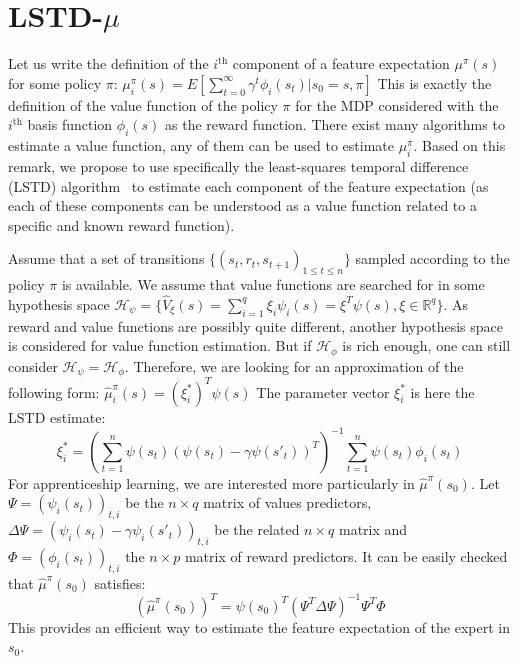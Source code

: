 \documentclass{llncs}
\begin{document}
\section{LSTD-$\mu$}
\label{sec:lstdmu}
Let us write the definition of the $i^\text{th}$ component of a
feature expectation $\mu^\pi(s)$ for some policy $\pi$:
$  \mu_i^\pi(s) = E[\sum\limits_{t=0}^\infty \gamma^t \phi_i(s_t)|s_0=s,\pi]$
This is exactly the definition of the value function of the policy
$\pi$ for the MDP considered with the $i^\text{th}$ basis function
$\phi_i(s)$ as the reward function. There exist many algorithms to
estimate a value function, any of them can be used to estimate
$\mu_i^\pi$. Based on this remark, we propose to use specifically
the least-squares temporal difference (LSTD)
algorithm~\citep{bradtke1996linear} to estimate each component of the
feature expectation (as each of these components can be understood
as a value function related to a specific and known reward
function).

Assume that a set of transitions $\{(s_t,r_t,s_{t+1})_{1\leq t \leq
n}\}$ sampled according to the policy $\pi$ is available. We assume
that value functions are searched for in some  hypothesis space
$\mathcal{H}_\psi = \{ \hat{V}_\xi(s) = \sum\limits_{i=1}^q \xi_i \psi_i(s)
= \xi^T \psi(s), \xi\in\mathbb{R}^q\}$. As reward and value
functions are possibly quite different, another hypothesis space is
considered for value function estimation. But if $\mathcal{H}_\phi$
is rich enough, one can still consider
$\mathcal{H}_\psi=\mathcal{H}_\phi$. Therefore, we are looking for
an approximation of the following form:
$  \hat{\mu}_i^\pi(s) = (\xi_i^*)^T \psi(s)$
The parameter vector $\xi_i^*$ is here the LSTD estimate:
\begin{equation}
  \xi_i^* = \left(\sum_{t=1}^n
  \psi(s_t)(\psi(s_t)-\gamma\psi(s'_{t}))^T\right)^{-1}
  \sum_{t=1}^n \psi(s_t) \phi_i(s_t)
\end{equation}
For apprenticeship learning, we are interested more particularly in
$\hat{\mu}^\pi(s_0)$. Let $\Psi = (\psi_i(s_t))_{t,i}$ be the
$n\times q$ matrix of values predictors, $\Delta\Psi = (\psi_i(s_t)
- \gamma\psi_i(s'_t))_{t,i}$ be the related $n\times q$ matrix and
$\Phi = (\phi_i(s_t))_{t,i}$ the $n\times p$ matrix of reward
predictors. It can be easily checked that $\hat{\mu}^\pi(s_0)$
satisfies:
\begin{equation}
  (\hat{\mu}^\pi(s_0))^T = \psi(s_0)^T (\Psi^T \Delta\Psi)^{-1} \Psi^T \Phi
\end{equation}
This provides an efficient way to estimate the feature expectation
of the expert in $s_0$.
\end{document}
